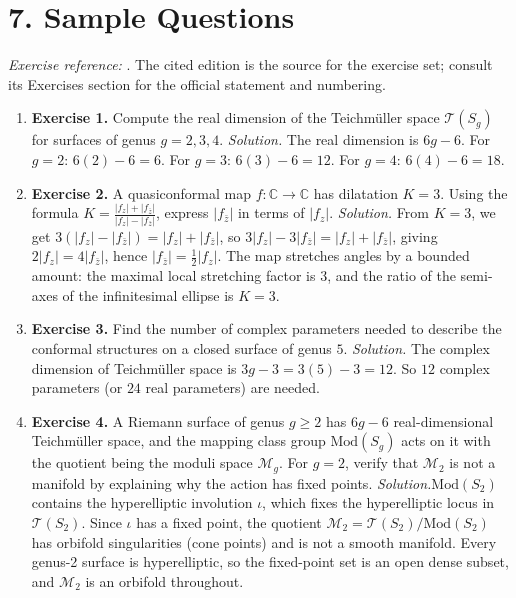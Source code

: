 \section*{7. Sample Questions}
\emph{Exercise reference:} \cite{teich_ref1}. The cited edition is the source for the exercise set; consult its Exercises section for the official statement and numbering.
\begin{enumerate}[leftmargin=*,itemsep=0.9em]
\item \textbf{Exercise 1.} Compute the real dimension of the Teichmüller space $\mathcal{T}(S_g)$ for surfaces of genus $g = 2, 3, 4$. \emph{Solution.} The real dimension is $6g - 6$. For $g = 2$: $6(2) - 6 = 6$. For $g = 3$: $6(3) - 6 = 12$. For $g = 4$: $6(4) - 6 = 18$.

\item \textbf{Exercise 2.} A quasiconformal map $f\colon \mathbb{C} \to \mathbb{C}$ has dilatation $K = 3$. Using the formula $K = \frac{|f_z| + |f_{\bar{z}}|}{|f_z| - |f_{\bar{z}}|}$, express $|f_{\bar{z}}|$ in terms of $|f_z|$. \emph{Solution.} From $K = 3$, we get $3(|f_z| - |f_{\bar{z}}|) = |f_z| + |f_{\bar{z}}|$, so $3|f_z| - 3|f_{\bar{z}}| = |f_z| + |f_{\bar{z}}|$, giving $2|f_z| = 4|f_{\bar{z}}|$, hence $|f_{\bar{z}}| = \frac{1}{2}|f_z|$. The map stretches angles by a bounded amount: the maximal local stretching factor is $3$, and the ratio of the semi-axes of the infinitesimal ellipse is $K = 3$.

\item \textbf{Exercise 3.} Find the number of complex parameters needed to describe the conformal structures on a closed surface of genus $5$. \emph{Solution.} The complex dimension of Teichmüller space is $3g - 3 = 3(5) - 3 = 12$. So $12$ complex parameters (or $24$ real parameters) are needed.

\item \textbf{Exercise 4.} A Riemann surface of genus $g \geq 2$ has $6g - 6$ real-dimensional Teichmüller space, and the mapping class group $\mathrm{Mod}(S_g)$ acts on it with the quotient being the moduli space $\mathcal{M}_g$. For $g = 2$, verify that $\mathcal{M}_2$ is not a manifold by explaining why the action has fixed points. \emph{Solution.}$\mathrm{Mod}(S_2)$ contains the hyperelliptic involution $\iota$, which fixes the hyperelliptic locus in $\mathcal{T}(S_2)$. Since $\iota$ has a fixed point, the quotient $\mathcal{M}_2 = \mathcal{T}(S_2)/\mathrm{Mod}(S_2)$ has orbifold singularities (cone points) and is not a smooth manifold. Every genus-2 surface is hyperelliptic, so the fixed-point set is an open dense subset, and $\mathcal{M}_2$ is an orbifold throughout.


\end{enumerate}
